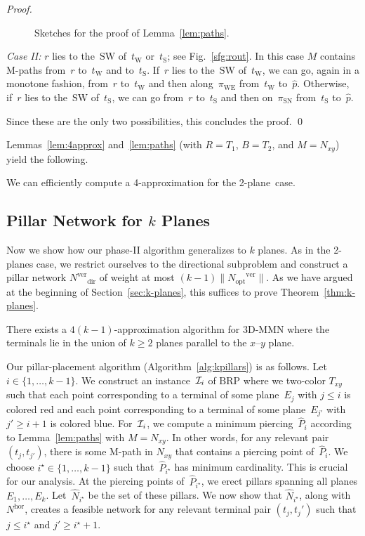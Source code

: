 \documentclass[11pt]{llncs}
\newcommand{\SW}{\ensuremath{\mathrm{SW}}\xspace}
\newcommand{\MSN}{\ensuremath{\pi_\mathrm{SN}}\xspace}
\newcommand{\MWE}{\ensuremath{\pi_\mathrm{WE}}\xspace}
\newcommand{\tW}{\ensuremath{t_\mathrm{W}}\xspace}
\newcommand{\tS}{\ensuremath{t_\mathrm{S}}\xspace}
\newcommand{\Nopt}{\ensuremath{N_\mathrm{opt}}\xspace}
\newcommand{\Nhor}{\ensuremath{N^\mathrm{hor}}\xspace}
\newcommand{\Nver}{\ensuremath{N^\mathrm{ver}}\xspace}
\newcommand{\dir}{\ensuremath{\mathrm{dir}}}
\newcommand{\Noptver}{\ensuremath{\Nopt^\mathrm{ver}}\xspace}
\newcommand{\Nxy}{\ensuremath{N_{xy}}\xspace}
\newcommand{\Txy}{\ensuremath{T_{xy}}\xspace}
\newcommand{\red}{\ensuremath{R}\xspace}
\newcommand{\blue}{\ensuremath{B}\xspace}
\newcommand{\BRP}{\ensuremath{\mathrm{BRP}}\xspace}
\newenvironment{pf}{\begin{proof}}{\qed\end{proof}}
\begin{document}
\begin{pf}
\begin{figure}
  \caption{Sketches for the proof of Lemma~\ref{lem:paths}.}
  \label{fig:paths}
\end{figure}

  \smallskip
  \emph{Case II:} $r$ lies to the~\SW of~\tW or~\tS; 
  see Fig.~\ref{sfg:rout}.
  In this case $M$ contains M-paths from~$r$ to~\tW and to~\tS.
  If~$r$ lies to the~\SW of~\tW, we can go, again in a monotone
  fashion, from~$r$ to~\tW and then along~\MWE from~\tW to~$\hat{p}$.
  Otherwise, if~$r$ lies to the~\SW of~\tS, we can go from~$r$
  to~\tS and then on~\MSN from~\tS to~$\hat{p}$.

  Since these are the only two possibilities, this concludes the proof.
\end{pf}

Lemmas~\ref{lem:4approx} and~\ref{lem:paths} (with $\red=T_1$,
$\blue=T_2$, and $M=\Nxy$) yield the following. \begin{theorem}
  \label{thm:select-pill-locat}
  We can efficiently compute a 4-approximation for the 2-plane~case.
\end{theorem}



\subsection{Pillar Network for $k$ Planes}\label{sec:pillark}

Now we show how our phase-II algorithm generalizes to $k$ planes. 
As in the 2-planes case, we restrict ourselves to the 
directional subproblem and construct a pillar network $\Nver_\dir$ of weight at
most $(k-1) \|\Noptver\|$.  As we have argued at the
beginning of Section~\ref{sec:k-planes}, this suffices to prove
Theorem~\ref{thm:k-planes}.  

\begin{theorem}
  \label{thm:k-planes}
  There exists a $4(k-1)$-approximation algorithm for 3D-MMN
  where the terminals lie in the union of $k \ge 2$ planes parallel to
  the $x$--$y$ plane.
\end{theorem}


Our pillar-placement algorithm (Algorithm~\ref{alg:kpillars}) is as
follows.  Let 
$i \in \{1,\dots,k-1\}$.  We construct an instance~${\cal I}_i$ of \BRP
where we two-color \Txy such that each point
corresponding to a terminal of some plane~$E_j$ with $j\leq i$ is
colored red and each point corresponding to a terminal of some
plane~$E_{j'}$ with $j'\geq i+1$ is colored blue.  For~${\cal I}_i$, we
compute a minimum piercing~$\hat{P}_i$ according to
Lemma~\ref{lem:paths} with $M=\Nxy$.  In other words, for any relevant
pair $(t_j,t_{j'})$, there is some M-path in $N_{xy}$ that contains a
piercing point of~$\hat{P}_i$.  We choose $i^\star \in \{1,\dots,k-1\}$
such that~$\hat{P}_{i^\star}$ has minimum cardinality.  This is
crucial for our analysis.
At the piercing points of~$\hat{P}_{i^\star}$, we erect pillars
spanning all planes $E_1,\ldots,E_k$.  Let~$\hat{N}_{i^\star}$ be the
set of these pillars.  We now show that
$\hat{N}_{i^\star}$, along with \Nhor, creates a feasible network for
any relevant terminal pair $(t_j, t_j')$ such that $j\le i^{\star}$
and $j'\ge i^{\star}+1$. 
\end{document}
